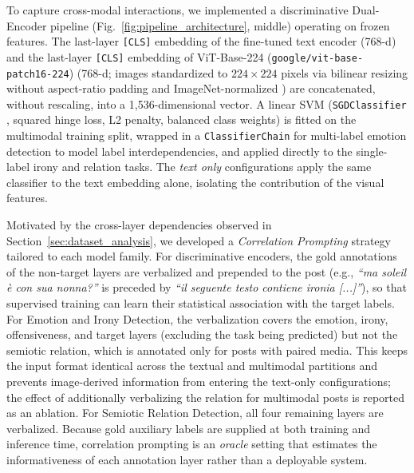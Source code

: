To capture cross-modal interactions, we implemented a discriminative Dual-Encoder pipeline (Fig.~\ref{fig:pipeline_architecture}, middle) operating on frozen features. The last-layer \texttt{[CLS]} embedding of the fine-tuned text encoder (768-d) \cite{devlin2019bert} and the last-layer \texttt{[CLS]} embedding of ViT-Base-224 (\texttt{google/vit-base-patch16-224}) \cite{dosovitskiy2021vit} (768-d; images standardized to $224\times224$ pixels via bilinear resizing without aspect-ratio padding and ImageNet-normalized \cite{deng2009imagenet}) are concatenated, without rescaling, into a 1,536-dimensional vector. A linear SVM (\texttt{SGDClassifier} \cite{pedregosa2011scikit}, squared hinge loss, L2 penalty, balanced class weights) is fitted on the multimodal training split, wrapped in a \texttt{ClassifierChain} \cite{read2011classifier} for multi-label emotion detection to model label interdependencies, and applied directly to the single-label irony and relation tasks. The \textit{text only} configurations apply the same classifier to the text embedding alone, isolating the contribution of the visual features.

Motivated by the cross-layer dependencies observed in Section~\ref{sec:dataset_analysis}, we developed a \textit{Correlation Prompting} strategy tailored to each model family. For discriminative encoders, the gold annotations of the non-target layers are verbalized and prepended to the post (e.g., \textit{``ma soleil è con sua nonna?''} is preceded by \textit{``il seguente testo contiene ironia [...]''}), so that supervised training can learn their statistical association with the target labels. For Emotion and Irony Detection, the verbalization covers the emotion, irony, offensiveness, and target layers (excluding the task being predicted) but not the semiotic relation, which is annotated only for posts with paired media. This keeps the input format identical across the textual and multimodal partitions and prevents image-derived information from entering the text-only configurations; the effect of additionally verbalizing the relation for multimodal posts is reported as an ablation. For Semiotic Relation Detection, all four remaining layers are verbalized. Because gold auxiliary labels are supplied at both training and inference time, correlation prompting is an \textit{oracle} setting that estimates the informativeness of each annotation layer rather than a deployable system.

